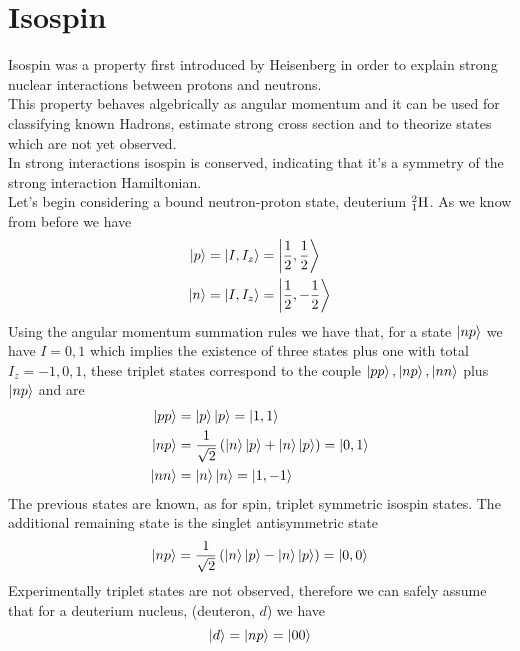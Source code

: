 \documentclass[../qm.tex]{subfiles}
\begin{document}
\section{Isospin}
Isospin was a property first introduced by Heisenberg in order to explain strong nuclear interactions between protons and neutrons.\\
This property behaves algebrically as angular momentum and it can be used for classifying known Hadrons, estimate strong cross section and to theorize states which are not yet observed.\\
In strong interactions isospin is conserved, indicating that it's a symmetry of the strong interaction Hamiltonian.\\
Let's begin considering a bound neutron-proton state, deuterium $\nuc{H}{2}{1}$. As we know from before we have
\begin{equation*}
	\begin{aligned}
		\ket{p}&=\ket{I,I_z}=\ket{\frac{1}{2},\frac{1}{2}}\\
		\ket{n}&=\ket{I,I_z}=\ket{\frac{1}{2},-\frac{1}{2}}
	\end{aligned}
\end{equation*}
Using the angular momentum summation rules we have that, for a state $\ket{np}$ we have $I=0,1$ which implies the existence of three states plus one with total $I_z=-1,0,1$, these triplet states correspond to the couple $\ket{pp},\ket{np},\ket{nn}$ plus $\ket{np}$ and are
\begin{equation}
	\begin{aligned}
		\ket{pp}&=\ket{p}\ket{p}=\ket{1,1}\\
		\ket{np}&=\frac{1}{\sqrt{2}}\left( \ket{n}\ket{p}+\ket{n}\ket{p} \right)=\ket{0,1}\\
		\ket{nn}&=\ket{n}\ket{n}=\ket{1,-1}
	\end{aligned}
	\label{eq:tripletisospin}
\end{equation}
The previous states are known, as for spin, triplet symmetric isospin states. The additional remaining state is the singlet antisymmetric state
\begin{equation}
	\ket{np}=\frac{1}{\sqrt{2}}\left( \ket{n}\ket{p}-\ket{n}\ket{p} \right)=\ket{0,0}
	\label{eq:singletisospin}
\end{equation}
Experimentally triplet states are not observed, therefore we can safely assume that for a deuterium nucleus, (deuteron, $d$) we have
\begin{equation}
	\ket{d}=\ket{np}=\ket{00}
	\label{eq:deuteriumisospin}
\end{equation}
\end{document}
